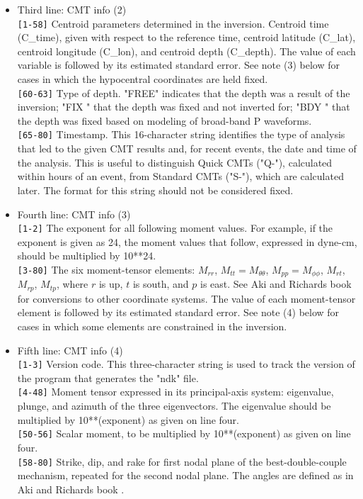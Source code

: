 \begin{itemize}
\item Third line: CMT info (2)\\
\verb|[1-58]|  Centroid parameters determined in the inversion. Centroid time ({\python C\_time}), given
        with respect to the reference time, centroid latitude ({\python C\_lat}), 
        centroid longitude ({\python C\_lon}), and centroid depth ({\python C\_depth}). 
        The value of each variable is followed
        by its estimated standard error. See note (3) below for cases in
        which the hypocentral coordinates are held fixed.\\
\verb|[60-63]| Type of depth. "FREE" indicates that the depth was a result of the
        inversion; "FIX " that the depth was fixed and not inverted for;
        "BDY " that the depth was fixed based on modeling of broad-band 
        P waveforms.\\
\verb|[65-80]| Timestamp. This 16-character string identifies the type of analysis that
        led to the given CMT results and, for recent events, the date and 
        time of the analysis. This is useful to distinguish Quick CMTs ("Q-"), 
        calculated within hours of an event, from Standard CMTs ("S-"), which 
        are calculated later. The format for this string should not be 
        considered fixed.

\item Fourth line: CMT info (3)\\
\verb|[1-2]| The exponent for all following moment values. For example, if the
        exponent is given as 24, the moment values that follow, expressed in 
        dyne-cm, should be multiplied by 10**24.\\
\verb|[3-80]| The six moment-tensor elements: $M_{rr}$, $M_{tt}=M_{\theta\theta}$, 
        $M_{pp}=M_{\phi\phi}$, $M_{rt}$, $M_{rp}$, $M_{tp}$, 
        where $r$ is up, $t$ is south, and $p$ is east. See Aki and Richards book \cite{akirichards}
        for conversions to other coordinate systems. The value of each moment-tensor
        element is followed by its estimated standard error. See note (4)
        below for cases in which some elements are constrained in the inversion.
        
\item Fifth line: CMT info (4)\\
\verb|[1-3]|   Version code. This three-character string is used to track the version 
        of the program that generates the "ndk" file.\\
\verb|[4-48]|  Moment tensor expressed in its principal-axis system: eigenvalue, 
        plunge, and azimuth of the three eigenvectors. The eigenvalue should be
        multiplied by 10**(exponent) as given on line four.\\
\verb|[50-56]| Scalar moment, to be multiplied by 10**(exponent) as given on line four.\\
\verb|[58-80]| Strike, dip, and rake for first nodal plane of the best-double-couple 
        mechanism, repeated for the second nodal plane. The angles are defined
        as in Aki and Richards book \cite{akirichards}.

\end{itemize}
          
